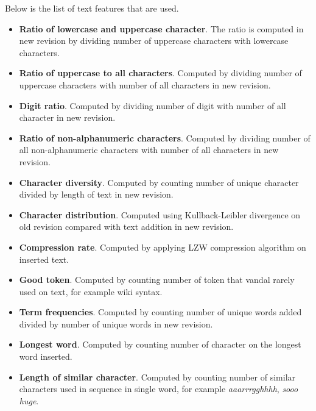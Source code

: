 Below is the list of text features that are used.

\begin{itemize}
\item \textbf{Ratio of lowercase and uppercase character}. The ratio is
computed in new revision by dividing number of uppercase characters with
lowercase characters.
\item \textbf{Ratio of uppercase to all characters}. Computed by dividing
number of uppercase characters with number of all characters in new revision.
\item \textbf{Digit ratio}. Computed by dividing number of digit with number of
all character in new revision.
\item \textbf{Ratio of non-alphanumeric characters}. Computed by dividing
number of all non-alphanumeric characters with number of all characters in new
revision.
\item \textbf{Character diversity}. Computed by counting number of unique
character divided by length of text in new revision.
\item \textbf{Character distribution}. Computed using Kullback-Leibler
divergence on old revision compared with text addition in new revision.
\item \textbf{Compression rate}. Computed by applying LZW compression algorithm
on inserted text.
\item \textbf{Good token}. Computed by counting number of token that vandal
rarely used on text, for example wiki syntax.
\item \textbf{Term frequencies}. Computed by counting number of unique words
added divided by number of unique words in new revision.
\item \textbf{Longest word}. Computed by counting number of character on the
longest word inserted.
\item \textbf{Length of similar character}. Computed by counting number of
similar characters used in sequence in single word, for example
\textit{aaarrrgghhhh}, \textit{sooo huge}.
\end{itemize}
